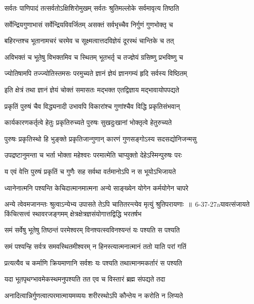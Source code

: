 \twolineshloka
{सर्वतः पाणिपादं तत्सर्वतोऽक्षिशिरोमुखम्}
{सर्वतः श्रुतिमल्लोके सर्वमावृत्य तिष्ठति}


\twolineshloka
{सर्वेन्द्रियगुणाभासं सर्वेन्द्रियविवर्जितम्}
{असक्तं सर्वभृच्चैव निर्गुणं गुणभोक्तृ च}


\twolineshloka
{बहिरन्तश्च भूतानामचरं चरमेव च}
{सूक्ष्मत्वात्तदविज्ञेयं दूरस्थं चान्तिके च तत्}


\twolineshloka
{अविभक्तं च भूतेषु विभक्तमिव च स्थितम्}
{भूतभर्तृ च तज्ज्ञेयं ग्रसिष्णु प्रभविष्णु च}


\twolineshloka
{ज्योतिषामपि तज्ज्योतिस्तमसः परमुच्यते}
{ज्ञानं ज्ञेयं ज्ञानगम्यं हृदि सर्वस्य विष्ठितम्}


\twolineshloka
{इति क्षेत्रं तथा ज्ञानं ज्ञेयं चोक्तं समासतः}
{मद्भक्त एतद्विज्ञाय मद्भावायोपपद्यते}


\twolineshloka
{प्रकृतिं पुरुषं चैव विद्ध्यनादी उभावपि}
{विकारांश्च गुणांश्चैव विद्धि प्रकृतिसंभवान्}


\twolineshloka
{कार्यकारणकर्तृत्वे हेतुः प्रकृतिरुच्यते}
{पुरुषः सुखदुःखानां भोक्तृत्वे हेतुरुच्यते}


\twolineshloka
{पुरुषः प्रकृतिस्थो हि भुङ्क्ते प्रकृतिजान्गुणान्}
{कारणं गुणसङ्गोऽस्य सदसद्योनिजन्मसु}


\twolineshloka
{उपद्रष्टानुमन्ता च भर्ता भोक्ता महेश्वरः}
{परमात्मेति चाप्युक्तो देहेऽस्मिन्पुरुषः परः}


\twolineshloka
{य एवं वेत्ति पुरुषं प्रकृतिं च गुणैः सह}
{सर्वथा वर्तमानोऽपि न स भूयोऽभिजायते}


\twolineshloka
{ध्यानेनात्मनि पश्यन्ति केचिदात्मानमात्मना}
{अन्ये साङ्ख्येन योगेन कर्मयोगेन चापरे}


\threelineshloka
{अन्ये त्वेवमजानन्तः श्रुत्वाऽन्येभ्य उपासते}
{तेऽपि चातितरन्त्येव मृत्युं श्रुतिपरायणाः ॥ 6-37-27aयावत्संजायते किंचित्सत्त्वं स्थावरजङ्गमम्}
{क्षेत्रक्षेत्रज्ञसंयोगात्तद्विद्धि भरतर्षभ}


\twolineshloka
{समं सर्वेषु भूतेषु तिष्ठन्तं परमेश्वरम्}
{विनश्यत्स्वविनश्यन्तं यः पश्यति स पश्यति}


\twolineshloka
{समं पश्यन्हि सर्वत्र समवस्थितमीश्वरम्}
{न हिनस्त्यात्मनात्मानं ततो याति परां गतिं}


\twolineshloka
{प्रत्यत्यैव च कर्माणि क्रियमाणानि सर्वशः}
{यः पश्यति तथात्मानमकर्तारं स पश्यति}


\twolineshloka
{यदा भूतपृथग्भावमेकस्थमनुपश्यति}
{तत एव च विस्तारं ब्रह्म संपद्यते तदा}


\twolineshloka
{अनादित्वान्निर्गुणत्वात्परमात्मायमव्ययः}
{शरीरस्थोऽपि कौन्तेय न करोति न लिप्यते}


